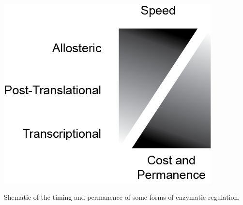 \documentclass{tufte-handout}
\begin{document}
\begin{marginfigure}
\includegraphics{figures/regulation-models.png}
\caption{Shematic of the timing and permanence of some forms of enzymatic regulation.}\label{fig:regulation-models}
\end{marginfigure}




\end{document}
